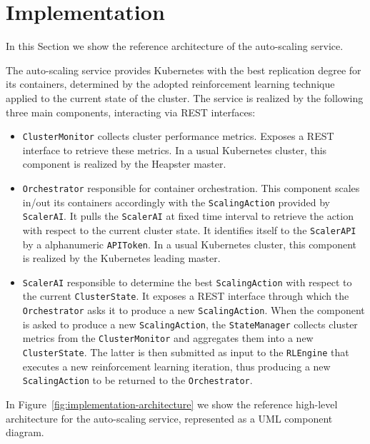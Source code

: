 \chapter{Implementation}
\label{chp:implementation}

In this Section we show the reference architecture of the auto-scaling service.

The auto-scaling service provides Kubernetes with the best replication degree for its containers, determined by the adopted reinforcement learning technique applied to the current state of the cluster.
%
The service is realized by the following three main components, interacting via REST interfaces:

\begin{itemize}
	
	\item \texttt{ClusterMonitor} collects cluster performance metrics. Exposes a REST interface to retrieve these metrics.
	In a usual Kubernetes cluster, this component is realized by the Heapster master.
	
	\item \texttt{Orchestrator} responsible for container orchestration. This component scales in/out its containers accordingly with the \texttt{ScalingAction} provided by \texttt{ScalerAI}. It pulls the \texttt{ScalerAI} at fixed time interval to retrieve the action with respect to the current cluster state. It identifies itself to the \texttt{ScalerAPI} by a alphanumeric \texttt{APIToken}.
	In a usual Kubernetes cluster, this component is realized by the Kubernetes leading master.
	
	\item \texttt{ScalerAI} responsible to determine the best \texttt{ScalingAction} with respect to the current \texttt{ClusterState}.
	It exposes a REST interface through which the \texttt{Orchestrator} asks it to produce a new \texttt{ScalingAction}.
	When the component is asked to produce a new \texttt{ScalingAction}, the \texttt{StateManager} collects cluster metrics from the \texttt{ClusterMonitor} and aggregates them into a new \texttt{ClusterState}.
	The latter is then submitted as input to the \texttt{RLEngine} that executes a new reinforcement learning iteration, thus producing a new \texttt{ScalingAction} to be returned to the \texttt{Orchestrator}.
	
\end{itemize}

In Figure~\ref{fig:implementation-architecture} we show the reference high-level architecture for the auto-scaling service, represented as a UML component diagram.

